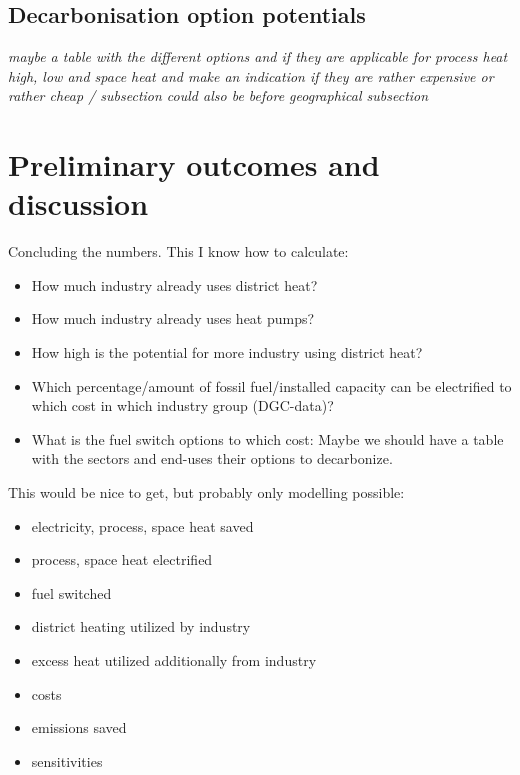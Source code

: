 \documentclass[review]{elsarticle}
\begin{document}
\subsection{Decarbonisation option potentials}
\textit{maybe a table with the different options and if they are applicable for process heat high, low and space heat and make an indication if they are rather expensive or rather cheap / subsection could also be before geographical subsection}



\section{Preliminary outcomes and discussion} \label{outcdisc}
Concluding the numbers. This I know how to calculate:
\begin{itemize}
    \item How much industry already uses district heat?
    \item How much industry already uses heat pumps?
    \item How high is the potential for more industry using district heat?
    \item Which percentage/amount of fossil fuel/installed capacity can be electrified to which cost in which industry group (DGC-data)?
    \item What is the fuel switch options to which cost: Maybe we should have a table with the sectors and end-uses their options to decarbonize.
\end{itemize}
This would be nice to get, but probably only modelling possible:
\begin{itemize}
    \item electricity, process, space heat saved
    \item process, space heat electrified
    \item fuel switched
    \item district heating utilized by industry
    \item excess heat utilized additionally from industry
    \item costs
    \item emissions saved
    \item sensitivities
\end{itemize}
\end{document}
